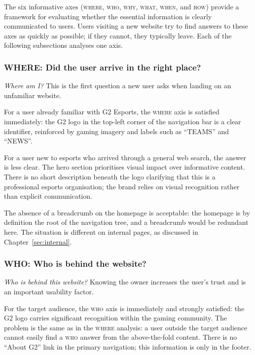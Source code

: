 \documentclass[12pt, a4paper]{article}
\begin{document}
The six informative axes (\textsc{where}, \textsc{who}, \textsc{why}, \textsc{what}, \textsc{when}, and \textsc{how}) provide a framework for evaluating whether the essential information is clearly communicated to users. Users visiting a new website try to find answers to these axes as quickly as possible; if they cannot, they typically leave. Each of the following subsections analyses one axis.

\subsubsection{WHERE: Did the user arrive in the right place?}

\textit{Where am I?} This is the first question a new user asks when landing on an unfamiliar website.

For a user already familiar with G2 Esports, the \textsc{where} axis is satisfied immediately: the G2 logo in the top-left corner of the navigation bar is a clear identifier, reinforced by gaming imagery and labels such as ``TEAMS'' and ``NEWS''.

For a user new to esports who arrived through a general web search, the answer is less clear. The hero section prioritises visual impact over informative content. There is no short description beneath the logo clarifying that this is a professional esports organisation; the brand relies on visual recognition rather than explicit communication.

The absence of a breadcrumb on the homepage is acceptable: the homepage is by definition the root of the navigation tree, and a breadcrumb would be redundant here. The situation is different on internal pages, as discussed in Chapter~\ref{sec:internal}.

\subsubsection{WHO: Who is behind the website?}

\textit{Who is behind this website?} Knowing the owner increases the user's trust and is an important usability factor.

For the target audience, the \textsc{who} axis is immediately and strongly satisfied: the G2 logo carries significant recognition within the gaming community. The problem is the same as in the \textsc{where} analysis: a user outside the target audience cannot easily find a \textsc{who} answer from the above-the-fold content. There is no ``About G2'' link in the primary navigation; this information is only in the footer.
\end{document}
